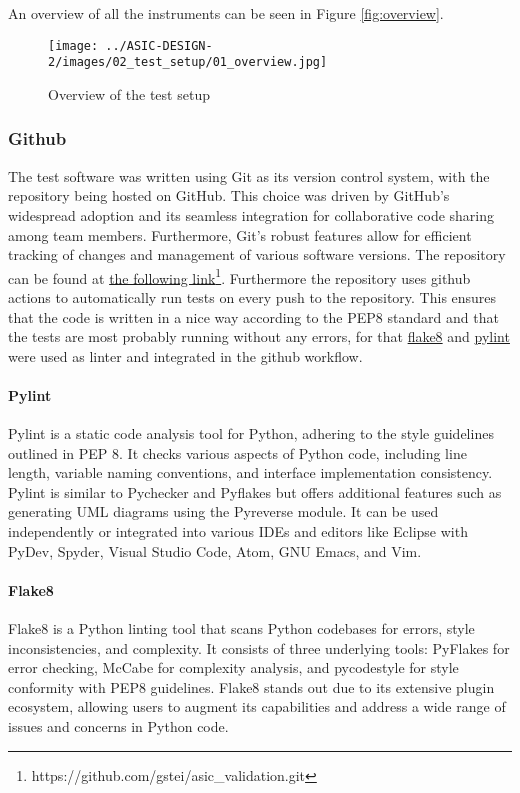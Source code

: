 An overview of all the instruments can be seen in Figure \autoref{fig:overview}.

\begin{figure}[h]
    \centering
    \texttt{[image: ../ASIC-DESIGN-2/images/02\_test\_setup/01\_overview.jpg]}
    \caption{Overview of the test setup}
    \label{fig:overview}
\end{figure}

\subsubsection{Github}
The test software was written using Git as its version control system, with the repository being hosted on GitHub. This choice was driven by GitHub's widespread adoption and its seamless integration for collaborative code sharing among team members. Furthermore, Git's robust features allow for efficient tracking of changes and management of various software versions. The repository can be found at \href{https://github.com/gstei/asic_validation.git}{the following link}\footnote{https://github.com/gstei/asic\_validation.git}. Furthermore the repository uses github actions to automatically run tests on every push to the repository. This ensures that the code is written in a nice way according to the PEP8 standard and that the tests are most probably running without any errors, for that \href{par:Flake8}{flake8} and \href{par:Pylint}{pylint} were used as linter and integrated in the github workflow.

\paragraph{Pylint}
\label{par:Pylint}
Pylint is a static code analysis tool for Python, adhering to the style guidelines outlined in PEP 8. It checks various aspects of Python code, including line length, variable naming conventions, and interface implementation consistency. Pylint is similar to Pychecker and Pyflakes but offers additional features such as generating UML diagrams using the Pyreverse module. It can be used independently or integrated into various IDEs and editors like Eclipse with PyDev, Spyder, Visual Studio Code, Atom, GNU Emacs, and Vim\cite{Wikipedia:Pylint}.

\paragraph{Flake8}
\label{Par:Flake8}
Flake8 is a Python linting tool that scans Python codebases for errors, style inconsistencies, and complexity. It consists of three underlying tools: PyFlakes for error checking, McCabe for complexity analysis, and pycodestyle for style conformity with PEP8 guidelines. Flake8 stands out due to its extensive plugin ecosystem, allowing users to augment its capabilities and address a wide range of issues and concerns in Python code\cite{flake8}.

